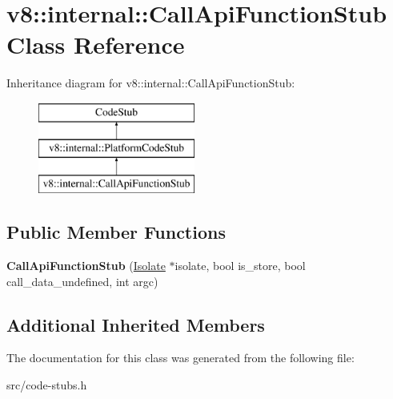 \hypertarget{classv8_1_1internal_1_1_call_api_function_stub}{}\section{v8\+:\+:internal\+:\+:Call\+Api\+Function\+Stub Class Reference}
\label{classv8_1_1internal_1_1_call_api_function_stub}
Inheritance diagram for v8\+:\+:internal\+:\+:Call\+Api\+Function\+Stub\+:\begin{figure}[H]
\begin{center}
\leavevmode
\includegraphics[height=3.000000cm]{classv8_1_1internal_1_1_call_api_function_stub}
\end{center}
\end{figure}
\subsection*{Public Member Functions}
\begin{DoxyCompactItemize}
\item 
\hypertarget{classv8_1_1internal_1_1_call_api_function_stub_a944c435181ee95b66eec91027f31589a}{}{\bfseries Call\+Api\+Function\+Stub} (\hyperlink{classv8_1_1internal_1_1_isolate}{Isolate} $\ast$isolate, bool is\+\_\+store, bool call\+\_\+data\+\_\+undefined, int argc)\label{classv8_1_1internal_1_1_call_api_function_stub_a944c435181ee95b66eec91027f31589a}

\end{DoxyCompactItemize}
\subsection*{Additional Inherited Members}


The documentation for this class was generated from the following file\+:\begin{DoxyCompactItemize}
\item 
src/code-\/stubs.\+h\end{DoxyCompactItemize}
